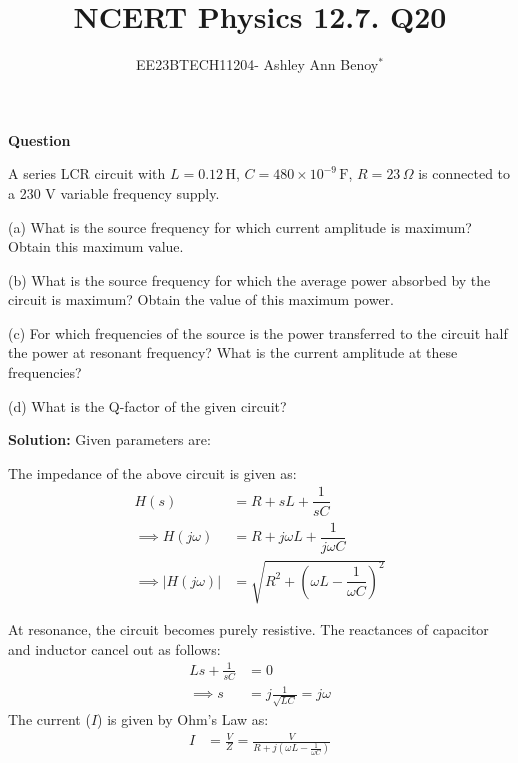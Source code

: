 \documentclass[journal,12pt,twocolumn]{IEEEtran}
\theoremstyle{remark}
\begin{document}

\vspace{3cm}

\title{NCERT Physics 12.7. Q20}
\author{EE23BTECH11204- Ashley Ann Benoy$^{*}$%
}
\maketitle
\newpage
\bigskip

\renewcommand{\thefigure}{\theenumi}
\renewcommand{\thetable}{\theenumi}



\textbf{Question}

A series LCR circuit with 
\(L = 0.12 \, \text{H}\),
\(C = 480 \times 10^{-9} \, \text{F}\), 
\(R=23 \, \Omega\)
is connected to a 230 V variable frequency supply.

(a) What is the source frequency for which current amplitude is maximum? Obtain this maximum value.

(b) What is the source frequency for which the average power absorbed by the circuit is maximum? Obtain the value of this maximum power.

(c) For which frequencies of the source is the power transferred to the circuit half the power at resonant frequency? What is the current amplitude at these frequencies?

(d) What is the Q-factor of the given circuit?

\textbf{Solution:}
Given parameters are:




The impedance of the above circuit is given as:
\begin{align}
     H(s) &= R + sL + \dfrac{1}{sC}\\
     \implies H(j\omega) &= R + j\omega L + \dfrac{1}{j\omega C}\\
     \implies \lvert H(j\omega) \rvert &= \sqrt{R^2 + \left(\omega L - \dfrac{1}{\omega C}\right)^2}
\end{align}

 At resonance, the circuit becomes purely resistive. The reactances of capacitor and inductor cancel out as follows:
\begin{align}
    Ls + \frac{1}{sC} &= 0 \\
    \implies s &= j\frac{1}{\sqrt{LC}} = j\omega
\end{align}
The current (\(I\)) is given by Ohm's Law as:
\begin{align}
    I &= \frac{V}{Z} = \frac{V}{R + j(\omega L - \frac{1}{\omega C})}
\end{align}
\end{document}
